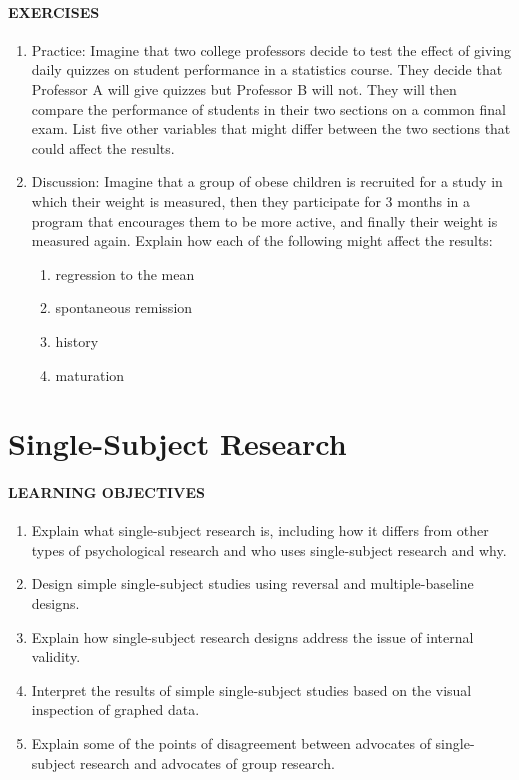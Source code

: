 \documentclass[
]{krantz}
\providecommand{\tightlist}{%
  \setlength{\itemsep}{0pt}\setlength{\parskip}{0pt}}
\begin{document}
\paragraph*{EXERCISES}\label{exercises-14}

\begin{enumerate}
\def\labelenumi{\arabic{enumi}.}
\tightlist
\item
  Practice: Imagine that two college professors decide to test the effect of giving daily quizzes on student performance in a statistics course. They decide that Professor A will give quizzes but Professor B will not. They will then compare the performance of students in their two sections on a common final exam. List five other variables that might differ between the two sections that could affect the results.
\item
  Discussion: Imagine that a group of obese children is recruited for a study in which their weight is measured, then they participate for 3 months in a program that encourages them to be more active, and finally their weight is measured again. Explain how each of the following might affect the results:

  \begin{enumerate}
  \def\labelenumii{\alph{enumii}.}
  \tightlist
  \item
    regression to the mean
  \item
    spontaneous remission
  \item
    history
  \item
    maturation
  \end{enumerate}
\end{enumerate}

\section{Single-Subject Research}\label{single-subject-research}

\paragraph*{LEARNING OBJECTIVES}\label{learning-objectives-17}

\begin{enumerate}
\def\labelenumi{\arabic{enumi}.}
\tightlist
\item
  Explain what single-subject research is, including how it differs from other types of psychological research and who uses single-subject research and why.
\item
  Design simple single-subject studies using reversal and multiple-baseline designs.
\item
  Explain how single-subject research designs address the issue of internal validity.
\item
  Interpret the results of simple single-subject studies based on the visual inspection of graphed data.
\item
  Explain some of the points of disagreement between advocates of single-subject research and advocates of group research.
\end{enumerate}
\end{document}
